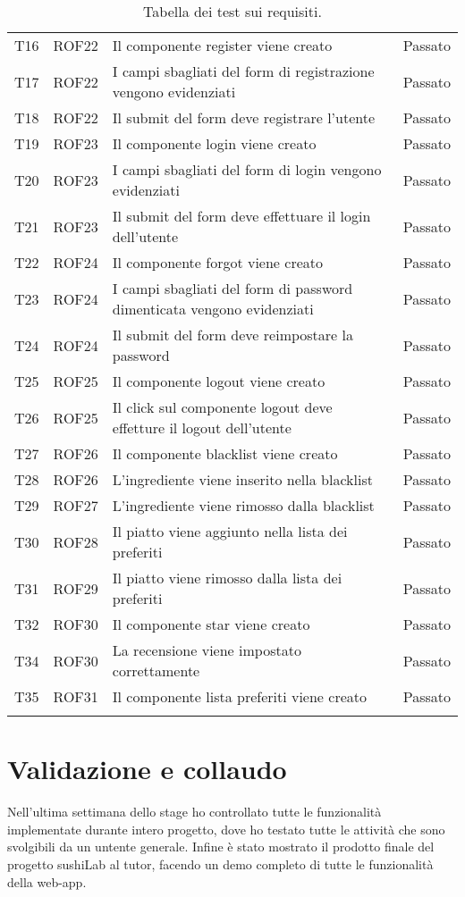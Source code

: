 \begin{center}
\begin{longtable}{ |p{1cm}|p{1.5cm}|p{9cm}|p{1.5cm}|  }
        T16&ROF22&Il componente register viene creato&Passato\\
        T17&ROF22&I campi sbagliati del form di registrazione vengono evidenziati&Passato\\
        T18&ROF22&Il submit del form deve registrare l'utente&Passato\\
        T19&ROF23&Il componente login viene creato&Passato\\
        T20&ROF23&I campi sbagliati del form di login vengono evidenziati &Passato\\
        T21&ROF23&Il submit del form deve effettuare il login dell'utente &Passato\\
        T22&ROF24&Il componente forgot viene creato  &Passato\\
        T23&ROF24&I campi sbagliati del form di password dimenticata vengono evidenziati &Passato\\
        T24&ROF24&Il submit del form deve reimpostare la password&Passato\\
        T25&ROF25&Il componente logout viene creato&Passato\\
        T26&ROF25&Il click sul componente logout deve effetture il logout dell'utente&Passato\\
        T27&ROF26&Il componente blacklist viene creato&Passato\\
        T28&ROF26&L'ingrediente viene inserito nella blacklist&Passato\\
        T29&ROF27&L'ingrediente viene rimosso dalla blacklist&Passato\\
        T30&ROF28&Il piatto viene aggiunto nella lista dei preferiti&Passato\\
        T31&ROF29&Il piatto viene rimosso dalla lista dei preferiti&Passato\\
        T32&ROF30&Il componente star viene creato&Passato\\
        T34&ROF30&La recensione viene impostato correttamente&Passato\\
        T35&ROF31&Il componente lista preferiti viene creato&Passato\\
\hline
\caption{\label{tab:tabella dei test sui requisiti}Tabella dei test sui requisiti.}
\end{longtable}
\end{center}
\section{Validazione e collaudo}
Nell'ultima settimana dello stage ho controllato tutte le funzionalità implementate durante intero progetto, dove ho testato tutte le attività che sono svolgibili da un untente generale. Infine è stato mostrato il prodotto finale del progetto sushiLab al tutor, facendo un demo completo di tutte le funzionalità della web-app.